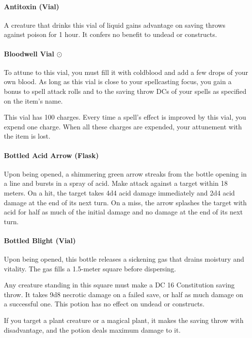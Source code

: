     \paragraph{Antitoxin (Vial)}
        A creature that drinks this vial of liquid gains advantage on saving throws against poison for 1 hour.
        It confers no benefit to undead or constructs.
    \paragraph{Bloodwell Vial $\odot$}
        To attune to this vial, you must fill it with coldblood and add a few drops of your own blood.
        As long as this vial is close to your spellcasting focus, you gain a bonus to spell attack rolls and to the saving throw DCs of your spells as specified on the item's name.

        This vial has 100 charges.
        Every time a spell's effect is improved by this vial, you expend one charge.
        When all these charges are expended, your attunement with the item is lost.
    \paragraph{Bottled Acid Arrow (Flask)} %
        Upon being opened, a shimmering green arrow streaks from the bottle opening in a line and bursts in a spray of acid.
        Make attack against a target within 18 meters.
        On a hit, the target takes 4d4 acid damage immediately and 2d4 acid damage at the end of its next turn.
        On a miss, the arrow splashes the target with acid for half as much of the initial damage and no damage at the end of its next turn.
    \paragraph{Bottled Blight (Vial)} %
        Upon being opened, this bottle releases a sickening gas that drains moistury and vitality.
        The gas fills a 1.5-meter square before dispersing.

        Any creature standing in this square must make a DC 16 Constitution saving throw.
        It takes 9d8 necrotic damage on a failed save, or half as much damage on a successful one.
        This potion has no effect on undead or constructs.

        If you target a plant creature or a magical plant, it makes the saving throw with disadvantage, and the potion deals maximum damage to it.

